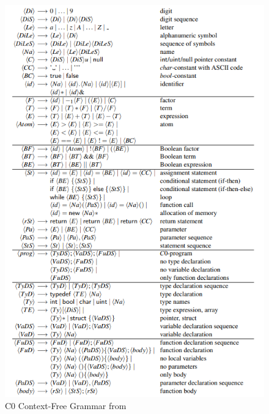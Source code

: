 \begin{figure}[h!]
    \center
    \includegraphics[width=13cm]{C0.png}
    \caption{C0 Context-Free Grammar from \cite{sysbook}}
    \label{fig:grammar_c0}
\end{figure}